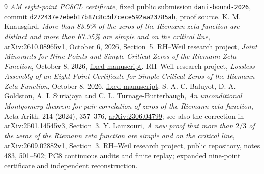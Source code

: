 \documentclass[11pt,a4paper]{article}
\begin{document}
\begin{thebibliography}{9}
\emph{AM eight-point PC8CL certificate}, fixed public submission
\texttt{dani-bound-2026}, commit
\texttt{d272437e7ebeb17b87c8c3d7cece592aa23785ab},
\href{https://github.com/josusanmartin/riemann/tree/d272437e7ebeb17b87c8c3d7cece592aa23785ab/submissions/dani-bound-2026/proof}{proof source}.
K. M. Knausg{\aa}rd, \emph{More than 83.9\% of the zeros of the
Riemann zeta function are distinct and more than 67.35\% are simple
and on the critical line},
\href{https://arxiv.org/abs/2610.08965v1}{arXiv:2610.08965v1},
October 6, 2026, Section~5.
RH--Weil research project, \emph{Joint Minorants for Nine Points and
Simple Critical Zeros of the Riemann Zeta Function}, October 8, 2026,
\href{https://github.com/lixiang90/RH-Weil/blob/609fe754aa6e9b22142f9539ddc28107145442f3/papers/nine-point-joint-minorant-simple-critical-paper.tex}{fixed manuscript}.
RH--Weil research project, \emph{Lossless Assembly of an Eight-Point
Certificate for Simple Critical Zeros of the Riemann Zeta Function},
October 8, 2026,
\href{https://github.com/lixiang90/RH-Weil/blob/0f7e6c21769b7a848fc9ce4cbf498eb91184874d/papers/lossless-eight-point-simple-critical-paper.tex}{fixed manuscript}.
S. A. C. Baluyot, D. A. Goldston, A. I. Suriajaya and
C. L. Turnage-Butterbaugh, \emph{An unconditional Montgomery theorem
for pair correlation of zeros of the Riemann zeta function},
Acta Arith. 214 (2024), 357--376,
\href{https://arxiv.org/abs/2306.04799}{arXiv:2306.04799}; see also
the correction in \href{https://arxiv.org/abs/2501.14545v3}{arXiv:2501.14545v3}, Section~3.
Y. Lamzouri, \emph{A new proof that more than $2/3$ of the zeros of
the Riemann zeta function are simple and on the critical line},
\href{https://arxiv.org/abs/2609.02882v1}{arXiv:2609.02882v1}, Section~3.
RH--Weil research project,
\href{https://github.com/lixiang90/RH-Weil}{public repository},
notes 483, 501--502; PC8 continuous audits and finite replay;
expanded nine-point certificate and independent reconstruction.
\end{thebibliography}
\end{document}
